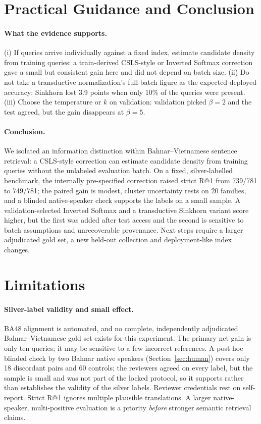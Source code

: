 \section{Practical Guidance and Conclusion}
\paragraph{What the evidence supports.} (i) If queries arrive individually against a fixed index, estimate candidate density from training queries: a train-derived CSLS-style or Inverted Softmax correction gave a small but consistent gain here and did not depend on batch size. (ii) Do not take a transductive normalization's full-batch figure as the expected deployed accuracy: Sinkhorn lost 3.9 points when only 10\% of the queries were present. (iii) Choose the temperature or $k$ on validation: validation picked $\beta=2$ and the test agreed, but the gain disappears at $\beta=5$.

\paragraph{Conclusion.} We isolated an information distinction within Bahnar--Vietnamese sentence retrieval: a CSLS-style correction can estimate candidate density from training queries without the unlabeled evaluation batch. On a fixed, silver-labelled benchmark, the internally pre-specified correction raised strict R@1 from 739/781 to 749/781; the paired gain is modest, cluster uncertainty rests on 20 families, and a blinded native-speaker check supports the labels on a small sample. A validation-selected Inverted Softmax and a transductive Sinkhorn variant score higher, but the first was added after test access and the second is sensitive to batch assumptions and unrecoverable provenance. Next steps require a larger adjudicated gold set, a new held-out collection and deployment-like index changes.

\section{Limitations}\label{sec:limitations}
\paragraph{Silver-label validity and small effect.} BA48 alignment is automated, and no complete, independently adjudicated Bahnar--Vietnamese gold set exists for this experiment. The primary net gain is only ten queries; it may be sensitive to a few incorrect references. A post hoc blinded check by two Bahnar native speakers (Section~\ref{sec:human}) covers only 18 discordant pairs and 60 controls; the reviewers agreed on every label, but the sample is small and was not part of the locked protocol, so it supports rather than establishes the validity of the silver labels. Reviewer credentials rest on self-report. Strict R@1 ignores multiple plausible translations. A larger native-speaker, multi-positive evaluation is a priority \emph{before} stronger semantic retrieval claims.

